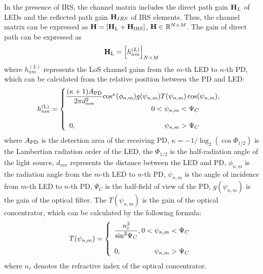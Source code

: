 \documentclass[conference]{IEEEtran}
\begin{document}
   In the presence of IRS, the channel matrix includes the direct path gain ${{\bf{H}}_L}$ of 
   LEDs and the reflected path gain ${{\bf{H}}_{IRS}}$ of IRS elements. Thus, the channel 
   matrix can be expressed as ${\bf{H}} = \left[ {{{\bf{H}}_{\rm{L}}} + {{\bf{H}}_{{\rm{IRS}}}}} \right]$, 
   ${\bf{H}} \in {\mathbb{R} ^{N \times M}}$.
   The gain of direct path can be expressed as
     \begin{equation}
     {{\bf{H}}_{\rm{L}}} = {\left[ {h_{nm}^{(L)}} \right]_{N \times M}} \label{eq2}
     \end{equation}
   where $h_{nm}^{(L)}$ represents the LoS channel gains from the $m$-th LED to 
   $n$-th PD, which can be calculated from the relative position between the 
   PD and LED:
\begin{equation}
h_{nm}^{({\rm{L}})} = \left\{ 
 \begin{array}{l}\!\!\!
\dfrac{{(\kappa  + 1){A_{{\rm{PD}}}}}}{{2\pi d_{nm}^2}}{\cos ^\kappa }({\phi _{n,m}})g({\psi _{n,m}})T({\psi _{n,m}})\cos ({\psi _{n,m}}),
 \\ {\kern 116pt} 0 < {\psi _{n,m}} < {\Psi _C}
 \\ \\ 0,{\rm{                                      }}
 {\kern 125pt} {\rm{   }}{\psi _{n,m}} > {\Psi _C}
 \end{array} \right.\
\label{eq3}
\end{equation}
   where ${A_{{\rm{PD}}}}$ is the detection area of the receiving PD, 
   $\kappa  =  - 1/{\log _2}(\cos {\Phi _{1/2}})$ is the Lambertian 
   radiation order of the LED, the ${\Phi _{1/2}}$ is 
   the half-radiation angle of the light source, ${d_{nm}}$ represents 
   the distance between the LED and PD, ${\phi _{n,m}}$ is the radiation 
   angle from the $m$-th LED to $n$-th PD, 
   ${\psi _{n,m}}$ is the angle of incidence from $m$-th LED to $n$-th PD, 
   ${\Psi _C}$ is the 
   half-field of view of the PD, $g({\psi _{n,m}})$ is the gain of the 
   optical filter. The $T({\psi _{n,m}})$ is the gain of the optical 
   concentrator, which can be calculated by the following formula:     
     \begin{equation}
     T({\psi _{n,m}}) = \left\{ \begin{array}{l}
     \dfrac{{n_r^2}}{{{{\sin }^2}{\Psi _C}}},0 < {\psi _{n,m}} < {\Psi _C}\\
     \\ 0,{\kern 47pt} 
      {\psi _{n,m}} > {\Psi _C}
     \end{array} \right.
     \label{eq4}
     \end{equation}
   where  $n_r$ denotes the refractive index of the optical concentrator.
\end{document}
